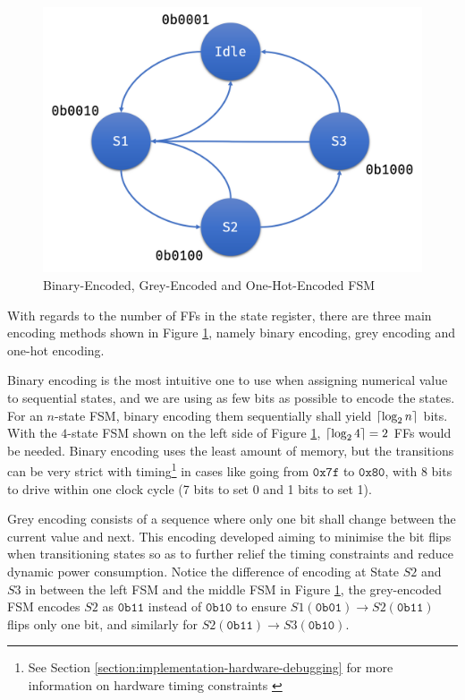 \documentclass[a4paper]{report}
\DeclarePairedDelimiter\ceil{\lceil}{\rceil}
\begin{document}
\begin{figure}[h!]
\begin{minipage}{0.35\textwidth}
        \includegraphics[width=\linewidth]{imgs/one-hot-fsm.png}
    \end{minipage}
    \caption{Binary-Encoded, Grey-Encoded and One-Hot-Encoded FSM}
    \label{fig:binary-grey-one-hot-encoded-FSM}
\end{figure}

With regards to the number of FFs in the state register, there are three main encoding methods shown in Figure \ref{fig:binary-grey-one-hot-encoded-FSM}, namely binary encoding, grey encoding and one-hot encoding.

Binary encoding is the most intuitive one to use when assigning numerical value to sequential states, and we are using as few bits as possible to encode the states. For an $n$-state FSM, binary encoding them sequentially shall yield $\ceil*{\log_2 n}$ bits. With the $4$-state FSM shown on the left side of Figure \ref{fig:binary-grey-one-hot-encoded-FSM}, $\ceil*{\log_2 4} = 2$ FFs would be needed. Binary encoding uses the least amount of memory, but the transitions can be very strict with timing\footnote{See Section \ref{section:implementation-hardware-debugging} for more information on hardware timing constraints \label{foot:timing-constraints}} in cases like going from $\mathtt{0x7f}$ to $\mathtt{0x80}$, with 8 bits to drive within one clock cycle (7 bits to set 0 and 1 bits to set 1).

Grey encoding consists of a sequence where only one bit shall change between the current value and next. This encoding developed aiming to minimise the bit flips when transitioning states so as to further relief the timing constraints and reduce dynamic power consumption. Notice the difference of encoding at State $S2$ and $S3$ in between the left FSM and the middle FSM in Figure \ref{fig:binary-grey-one-hot-encoded-FSM}, the grey-encoded FSM encodes $S2$ as $\mathtt{0b11}$ instead of $\mathtt{0b10}$ to ensure $S1 (\mathtt{0b01})\xrightarrow{}S2(\mathtt{0b11})$ flips only one bit, and similarly for $S2 (\mathtt{0b11})\xrightarrow{}S3(\mathtt{0b10})$.
\end{document}
